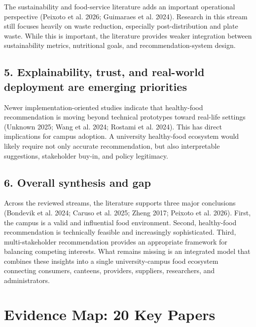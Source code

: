 \documentclass[
  letterpaper,
  DIV=11,
  numbers=noendperiod]{scrartcl}
\begin{document}
The sustainability and food-service literature adds an important
operational perspective ({Peixoto et al.} 2026; {Guimaraes et al.}
2024). Research in this stream still focuses heavily on waste reduction,
especially post-distribution and plate waste. While this is important,
the literature provides weaker integration between sustainability
metrics, nutritional goals, and recommendation-system design.

\subsection{5. Explainability, trust, and real-world deployment are
emerging
priorities}\label{explainability-trust-and-real-world-deployment-are-emerging-priorities}

Newer implementation-oriented studies indicate that healthy-food
recommendation is moving beyond technical prototypes toward real-life
settings (Unknown 2025; {Wang et al.} 2024; {Rostami et al.} 2024). This
has direct implications for campus adoption. A university healthy-food
ecosystem would likely require not only accurate recommendation, but
also interpretable suggestions, stakeholder buy-in, and policy
legitimacy.

\subsection{6. Overall synthesis and
gap}\label{overall-synthesis-and-gap}

Across the reviewed streams, the literature supports three major
conclusions ({Bondevik et al.} 2024; {Caruso et al.} 2025; Zheng 2017;
{Peixoto et al.} 2026). First, the campus is a valid and influential
food environment. Second, healthy-food recommendation is technically
feasible and increasingly sophisticated. Third, multi-stakeholder
recommendation provides an appropriate framework for balancing competing
interests. What remains missing is an integrated model that combines
these insights into a single university-campus food ecosystem connecting
consumers, canteens, providers, suppliers, researchers, and
administrators.

\section{Evidence Map: 20 Key Papers}\label{evidence-map-20-key-papers}
\end{document}
